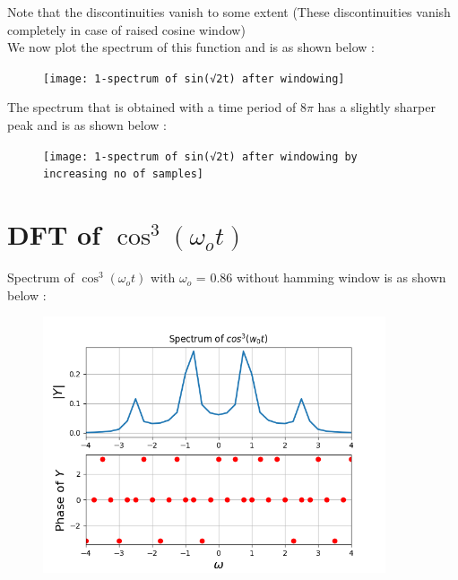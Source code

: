 \documentclass[10pt,a4paper]{article}
\begin{document}
Note that the discontinuities vanish to some extent (These discontinuities vanish completely in case of raised cosine window) \\

We now plot the spectrum of this function and is as shown below : 

\begin{figure}[!tbh]

\texttt{[image: 1-spectrum of sin(√2t) after windowing]}

\end{figure}

The spectrum that is obtained with a time period of $8\pi$ has a slightly sharper peak and is as shown below :

\begin{figure}[!tbh]

\texttt{[image: 1-spectrum of sin(√2t) after windowing by increasing no of samples]}

\end{figure}

\section{DFT of  $\cos^{3} (\omega_ot)$}

Spectrum of $\cos^{3} (\omega_ot)$ with $\omega_o$ = 0.86 without hamming window is as shown below : 

\begin{figure}[!tbh]

\includegraphics[width = 0.9\textwidth]{2-spectrum of cos cube(0.86t) without windowing}

\end{figure}
\end{document}
